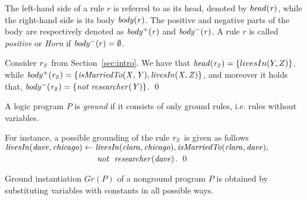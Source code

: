 The left-hand side of a rule $r$ is referred to as its head, denoted by $\mathit{head(r)}$, while the right-hand side is its body $\mathit{body(r)}$. The positive and negative parts of the body are respectively denoted as $\mathit{body^+(r)}$ and $\mathit{body^-(r)}$. A rule $r$ is called \emph{positive} or
\emph{Horn} if $\mathit{body^-}(r)=\emptyset$.

\begin{example}
Consider $\mathit{r_2}$ from Section~\ref{sec:intro}. We have that $\mathit{head(r_2)}=\{livesIn(Y,Z)\}$, while $\mathit{body^+(r_2)=\{isMarriedTo(X,Y), livesIn(X,Z)\}}$, and moreover it holds that, $\mathit{body^-(r_2)=\{not\;researcher(Y)\}}$. \qed
\end{example}


 


  
  



A logic program $P$ is \emph{ground} if it consists of only ground rules, i.e. rules without
variables. 

\begin{example}
For instance, a possible grounding of the rule $\mathit{r_2}$ is given as follows $\mathit{livesIn(dave,chicago)\leftarrow livesIn(clara,chicago),isMarriedTo(clara,dave),}$\\$
\phantom{livesIn(dave,chicago)\leftarrow}\mathit{not}~ \mathit{\;researcher(dave)}$. \qed
\end{example}

Ground instantiation $Gr(P)$ of a nonground program $P$ is obtained by substituting variables with constants in all possible ways. 


